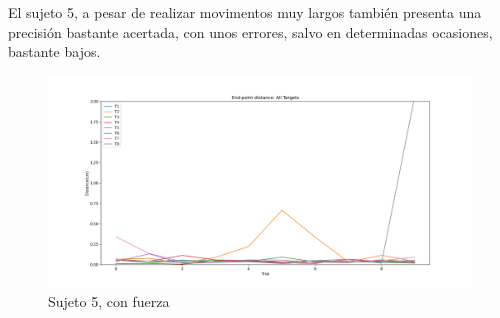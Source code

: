 \documentclass[a4paper,11pt, oneside]{book}
\begin{document}
El sujeto 5, a pesar de realizar movimentos muy largos también presenta una precisión bastante acertada, con unos errores, salvo en determinadas ocasiones, bastante bajos.

\begin{figure}[h!]
	\begin{minipage}[b]{0.5\linewidth}
		\centering
		\includegraphics[width=\linewidth]{sujeto5/force/evolution_distance}
		\caption{Sujeto 5, con fuerza}
		\label{fig:figura1}
	\end{minipage}
\end{figure}
\end{document}
